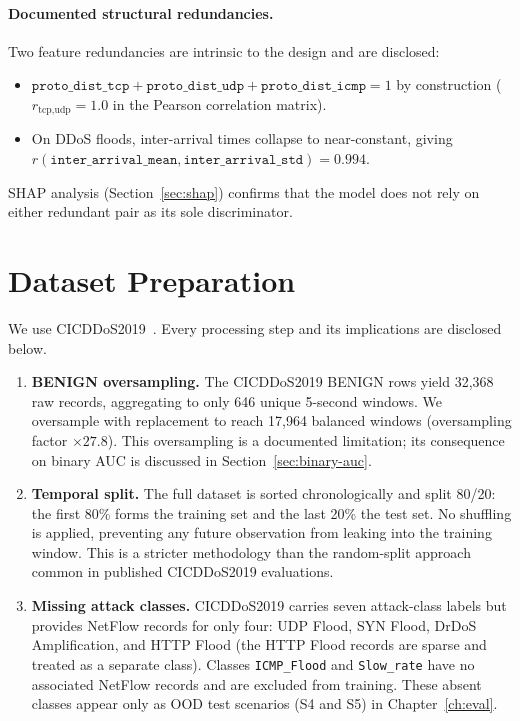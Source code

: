 \paragraph{Documented structural redundancies.}
Two feature redundancies are intrinsic to the design and are disclosed:

\begin{itemize}
  \item $\texttt{proto\_dist\_tcp} + \texttt{proto\_dist\_udp} +
        \texttt{proto\_dist\_icmp} = 1$ by construction
        ($r_{\text{tcp,udp}} = 1.0$ in the Pearson correlation matrix).
  \item On DDoS floods, inter-arrival times collapse to near-constant,
        giving $r(\texttt{inter\_arrival\_mean},
        \texttt{inter\_arrival\_std}) = 0.994$.
\end{itemize}

SHAP analysis (Section~\ref{sec:shap}) confirms that the model does not
rely on either redundant pair as its sole discriminator.

\section{Dataset Preparation}
\label{sec:dataset-limits}

We use CICDDoS2019~\citep{sharafaldin2019cicddos}. Every processing step
and its implications are disclosed below.

\begin{enumerate}
  \item \textbf{BENIGN oversampling.} The CICDDoS2019 BENIGN rows yield
        32{,}368 raw records, aggregating to only 646 unique 5-second
        windows. We oversample with replacement to reach 17{,}964 balanced
        windows (oversampling factor $\times 27.8$). This oversampling is
        a documented limitation; its consequence on binary AUC is discussed
        in Section~\ref{sec:binary-auc}.

  \item \textbf{Temporal split.} The full dataset is sorted chronologically
        and split 80/20: the first 80\% forms the training set and the
        last 20\% the test set. No shuffling is applied, preventing any
        future observation from leaking into the training window. This is
        a stricter methodology than the random-split approach common in
        published CICDDoS2019 evaluations.

  \item \textbf{Missing attack classes.} CICDDoS2019 carries seven
        attack-class labels but provides NetFlow records for only four:
        UDP Flood, SYN Flood, DrDoS Amplification, and HTTP Flood
        (the HTTP Flood records are sparse and treated as a separate
        class). Classes \texttt{ICMP\_Flood} and \texttt{Slow\_rate}
        have no associated NetFlow records and are excluded from training.
        These absent classes appear only as OOD test scenarios
        (S4 and S5) in Chapter~\ref{ch:eval}.
\end{enumerate}

